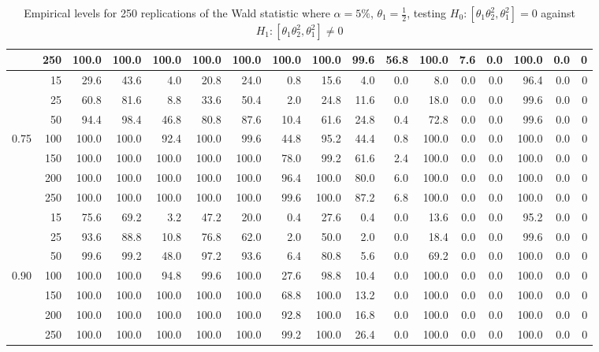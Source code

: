 \documentclass[11pt]{article}\usepackage[]{graphicx}\usepackage[]{color}
\begin{document}
\begin{table}[H]
{\begin{tabular}{|r|r|r|r|r|r|r|r|r|r|r|r|r|r|r|r|r|}
			& 250 & 100.0 & 100.0 & 100.0 & 100.0 & 100.0 & 100.0 & 100.0 & 99.6 & 56.8 & 100.0 & 7.6 & 0.0 & 100.0 & 0.0 & 0 \\
			\hline
			& 15 & 29.6 & 43.6 & 4.0 & 20.8 & 24.0 & 0.8 & 15.6 & 4.0 & 0.0 & 8.0 & 0.0 & 0.0 & 96.4 & 0.0 & 0 \\
			& 25 & 60.8 & 81.6 & 8.8 & 33.6 & 50.4 & 2.0 & 24.8 & 11.6 & 0.0 & 18.0 & 0.0 & 0.0 & 99.6 & 0.0 & 0 \\
			& 50 & 94.4 & 98.4 & 46.8 & 80.8 & 87.6 & 10.4 & 61.6 & 24.8 & 0.4 & 72.8 & 0.0 & 0.0 & 99.6 & 0.0 & 0 \\
			0.75 & 100 & 100.0 & 100.0 & 92.4 & 100.0 & 99.6 & 44.8 & 95.2 & 44.4 & 0.8 & 100.0 & 0.0 & 0.0 & 100.0 & 0.0 & 0 \\
			& 150 & 100.0 & 100.0 & 100.0 & 100.0 & 100.0 & 78.0 & 99.2 & 61.6 & 2.4 & 100.0 & 0.0 & 0.0 & 100.0 & 0.0 & 0 \\
			& 200 & 100.0 & 100.0 & 100.0 & 100.0 & 100.0 & 96.4 & 100.0 & 80.0 & 6.0 & 100.0 & 0.0 & 0.0 & 100.0 & 0.0 & 0 \\
			& 250 & 100.0 & 100.0 & 100.0 & 100.0 & 100.0 & 99.6 & 100.0 & 87.2 & 6.8 & 100.0 & 0.0 & 0.0 & 100.0 & 0.0 & 0 \\
			\hline
			& 15 & 75.6 & 69.2 & 3.2 & 47.2 & 20.0 & 0.4 & 27.6 & 0.4 & 0.0 & 13.6 & 0.0 & 0.0 & 95.2 & 0.0 & 0 \\
			& 25 & 93.6 & 88.8 & 10.8 & 76.8 & 62.0 & 2.0 & 50.0 & 2.0 & 0.0 & 18.4 & 0.0 & 0.0 & 99.6 & 0.0 & 0 \\
			& 50 & 99.6 & 99.2 & 48.0 & 97.2 & 93.6 & 6.4 & 80.8 & 5.6 & 0.0 & 69.2 & 0.0 & 0.0 & 100.0 & 0.0 & 0 \\
			0.90 & 100 & 100.0 & 100.0 & 94.8 & 99.6 & 100.0 & 27.6 & 98.8 & 10.4 & 0.0 & 100.0 & 0.0 & 0.0 & 100.0 & 0.0 & 0 \\
			& 150 & 100.0 & 100.0 & 100.0 & 100.0 & 100.0 & 68.8 & 100.0 & 13.2 & 0.0 & 100.0 & 0.0 & 0.0 & 100.0 & 0.0 & 0 \\
			& 200 & 100.0 & 100.0 & 100.0 & 100.0 & 100.0 & 92.8 & 100.0 & 16.8 & 0.0 & 100.0 & 0.0 & 0.0 & 100.0 & 0.0 & 0 \\
			& 250 & 100.0 & 100.0 & 100.0 & 100.0 & 100.0 & 99.2 & 100.0 & 26.4 & 0.0 & 100.0 & 0.0 & 0.0 & 100.0 & 0.0 & 0 \\
			\hline
		\end{tabular}
	}
	\caption{Empirical levels for 250 replications of the Wald statistic where $\alpha = 5\%$, $\theta_1=\frac{1}{2}$, testing $H_0: \left[ \theta_1\theta_2^2, \theta_1^2\right] =0$ against $H_1: \left[ \theta_1\theta_2^2, \theta_1^2\right] \neq 0$}
	\label{tbl:W:15}
\end{table}
\end{document}
